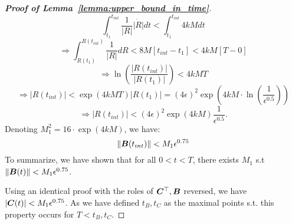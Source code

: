 \begin{proof}[\textbf{Proof of Lemma~\ref{lemma:upper_bound_in_time}}]
\begin{equation}
    \int_{t_1}^{t_{int}} \frac{1}{|R|}\dot{|R|} dt < \int_{t_1}^{t_{int}}4k M dt
\end{equation}
\begin{equation}
    \Rightarrow \int_{R(t_1)}^{R(t_{int})} \frac{1}{|R|}dR < 8 M [t_{int}-t_1] < 4kM [T-0]
\end{equation}
\begin{equation}
    \Rightarrow \ln\left( \frac{|R(t_{int})|}{|R(t_1)|} \right) < 4k M T 
\end{equation}
\begin{equation}
    \Rightarrow |R(t_{int})| < \exp(4k M T) |R(t_1)| = (4 \epsilon)^2 \exp\left(4k M \cdot \ln \left( \frac{1}{\epsilon^{0.5}} \right)\right)
\end{equation}
\begin{equation}
  \Rightarrow  |R(t_{int})| <  (4 \epsilon)^2 \exp(4k M) \frac{1}{\epsilon^{0.5}}.
\end{equation}
%
Denoting $M_1^2 = 16 \cdot \exp(4kM)$, we have:
\begin{equation}
    \|{\bm{B}}(t_{int})\| <  M_1 \epsilon^{0.75}
\end{equation}
%
To summarize, we have shown that for all $0<t<T$, there exists $M_1$ s.t $\|{\bm{B}}(t)\|<M_1 \epsilon^{0.75}$.

Using an identical proof with the roles of ${\bm{C}}^\top, {\bm{B}}$ reversed, we have $|{\bm{C}}(t)|<M_1 \epsilon^{0.75}$. As we have defined $t_B, t_C$ as the maximal points s.t. this property occurs for $T< t_B, t_C$.


\end{proof}

